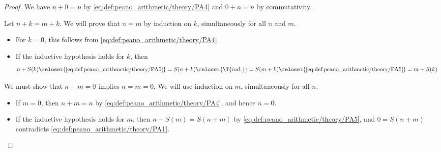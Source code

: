 \begin{proof}
   We have \( n + 0 = n \) by \eqref{eq:def:peano_arithmetic/theory/PA4} and \( 0 + n = n \) by commutativity.

   Let \( n + k = m + k \). We will prove that \( n = m \) by induction on \( k \), simultaneously for all \( n \) and \( m \).
  \begin{itemize}
    \item For \( k = 0 \), this follows from \eqref{eq:def:peano_arithmetic/theory/PA4}.
    \item If the inductive hypothesis holds for \( k \), then
    \begin{equation*}
      n + S(k)
      \reloset {\eqref{eq:def:peano_arithmetic/theory/PA5}} =
      S(n + k)
      \reloset {\T{ind.}} =
      S(m + k)
      \reloset {\eqref{eq:def:peano_arithmetic/theory/PA5}} =
      m + S(k)
    \end{equation*}
  \end{itemize}

   We must show that \( n + m = 0 \) implies \( n = m = 0 \). We will use induction on \( m \), simultaneously for all \( n \).

  \begin{itemize}
    \item If \( m = 0 \), then \( n + m = n \) by \eqref{eq:def:peano_arithmetic/theory/PA4}, and hence \( n = 0 \).

    \item If the inductive hypothesis holds for \( m \), then \( n + S(m) = S(n + m) \) by \eqref{eq:def:peano_arithmetic/theory/PA5}, and \( 0 = S(n + m) \) contradicts \eqref{eq:def:peano_arithmetic/theory/PA1}.
  \end{itemize}
\end{proof}

